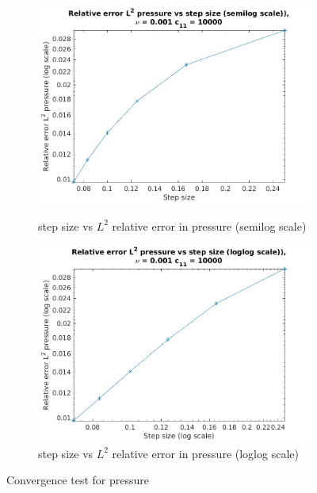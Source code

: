 \documentclass[a4paper,oneside,openright,spanish,english]{book}
\begin{document}
\begin{figure}
\begin{subfigure}{\textwidth}	
  \includegraphics[width=\linewidth]{step_size_vs_pressure_l2_error_semilog.jpg}
  \caption{step size vs $L^2$ relative error in pressure (semilog scale)} 
  \label{step_size_vs_pressure_l2_error_semilog}
  \includegraphics[width=\linewidth]{step_size_vs_pressure_l2_error_loglog.jpg}
  \caption{step size vs $L^2$ relative error in pressure (loglog scale)} 
  \label{step_size_vs_pressure_l2_error_loglog}
\end{subfigure}
\caption{Convergence test for pressure}
\label{convergence_check_pressure}
\end{figure}
\end{document}
